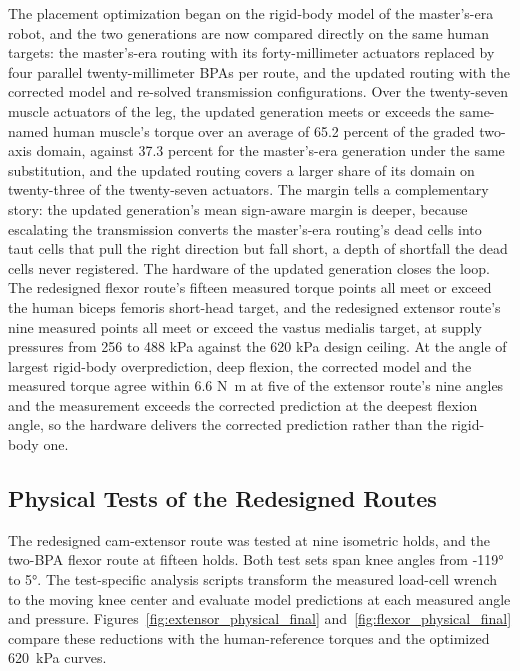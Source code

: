 The placement optimization began on the rigid-body model of the master's-era robot, and the two generations are now compared directly on the same human targets: the master's-era routing with its forty-millimeter actuators replaced by four parallel twenty-millimeter BPAs per route, and the updated routing with the corrected model and re-solved transmission configurations. Over the twenty-seven muscle actuators of the leg, the updated generation meets or exceeds the same-named human muscle's torque over an average of 65.2 percent of the graded two-axis domain, against 37.3 percent for the master's-era generation under the same substitution, and the updated routing covers a larger share of its domain on twenty-three of the twenty-seven actuators. The margin tells a complementary story: the updated generation's mean sign-aware margin is deeper, because escalating the transmission converts the master's-era routing's dead cells into taut cells that pull the right direction but fall short, a depth of shortfall the dead cells never registered. The hardware of the updated generation closes the loop. The redesigned flexor route's fifteen measured torque points all meet or exceed the human biceps femoris short-head target, and the redesigned extensor route's nine measured points all meet or exceed the vastus medialis target, at supply pressures from 256 to 488 \unit{\kilo\pascal} against the 620 \unit{\kilo\pascal} design ceiling. At the angle of largest rigid-body overprediction, deep flexion, the corrected model and the measured torque agree within 6.6 \unit{\newton\meter} at five of the extensor route's nine angles and the measurement exceeds the corrected prediction at the deepest flexion angle, so the hardware delivers the corrected prediction rather than the rigid-body one.

\subsection{Physical Tests of the Redesigned Routes}\label{sec:redesign_physical}

The redesigned cam-extensor route was tested at nine isometric holds, and the two-BPA flexor route at fifteen holds. Both test sets span knee angles from \ang{-119} to \ang{5}. The test-specific analysis scripts transform the measured load-cell wrench to the moving knee center and evaluate model predictions at each measured angle and pressure. Figures~\ref{fig:extensor_physical_final} and~\ref{fig:flexor_physical_final} compare these reductions with the human-reference torques and the optimized \qty{620}{\kPa} curves.

